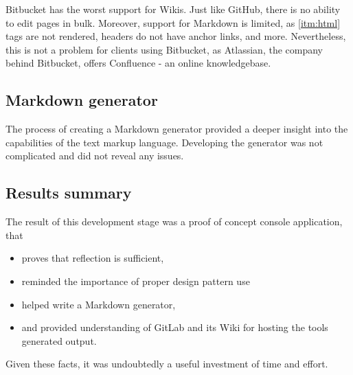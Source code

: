 Bitbucket has the worst support for Wikis.
Just like GitHub, there is no ability to edit pages in bulk.
Moreover, support for Markdown is limited, as \ref{itm:html} tags are not rendered, headers do not have anchor links, and more.
Nevertheless, this is not a problem for clients using Bitbucket, as Atlassian, the company behind Bitbucket, offers Confluence - an online knowledgebase.

\subsection{Markdown generator}

The process of creating a Markdown generator provided a deeper insight into the capabilities of the text markup language. Developing the generator was not complicated and did not reveal any issues.

\subsection{Results summary}

The result of this development stage was a proof of concept console application, that
\begin{itemize}
    \item proves that reflection is sufficient,
    \item reminded the importance of proper design pattern use
    \item helped write a Markdown generator,
    \item and provided understanding of GitLab and its Wiki for hosting the tools generated output.
\end{itemize}

Given these facts, it was undoubtedly a useful investment of time and effort.